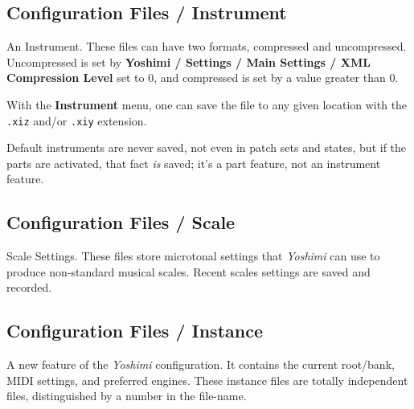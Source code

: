 \subsection{Configuration Files / Instrument}
\label{subsec:configuration_instrument}

   An Instrument.  These files can have two formats, compressed and
   uncompressed.
   Uncompressed is set by
   \textbf{Yoshimi / Settings / Main Settings / XML Compression Level} set to
   0, and compressed is set by a value greater than 0.

   With the \textbf{Instrument} menu, one can save the file to any
   given location with the \texttt{.xiz} and/or \texttt{.xiy} extension.

   Default instruments are never saved, not even in patch sets and states, but
   if the parts are activated, that fact \textsl{is} saved; it's a part
   feature, not an instrument feature.

\subsection{Configuration Files / Scale}
\label{subsec:configuration_scale}

   Scale Settings.  These files store microtonal settings that \textsl{Yoshimi}
   can use to produce non-standard musical scales.  Recent scales settings are
   saved and recorded.



\subsection{Configuration Files / Instance}
\label{subsec:configuration_instance}

   A new feature of the \textsl{Yoshimi} configuration.
   It contains the current root/bank, MIDI settings, and preferred engines.
   These instance files are totally independent files, distinguished by a number
   in the file-name.

